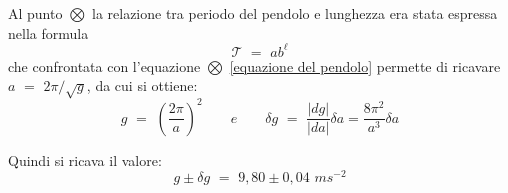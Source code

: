 Al punto $\bigotimes$ la relazione tra periodo del pendolo e lunghezza era stata espressa nella formula
\begin{equation*}
	\mathcal{T} \,\, = \,\, ab^{\ell}
\end{equation*}
che confrontata con l'equazione $\bigotimes$ \ref{equazione del pendolo} permette di ricavare $a \,\, = \,\, 2 \pi / \sqrt{g}$, da cui si ottiene:
\begin{equation}
	g \,\, = \,\, \left( \frac{2 \pi}{a}\right)^2 \quad\quad e \quad\quad \delta g \,\, = \,\, \frac{\vert dg \vert}{\vert da\vert} \delta a = \frac{8 \pi^2}{a^3} \delta a
\end{equation}

Quindi si ricava il valore:
\begin{equation}
	g \pm \delta g \,\, = \,\, 9,80 \pm 0,04 \,\, ms^{-2}
\end{equation}